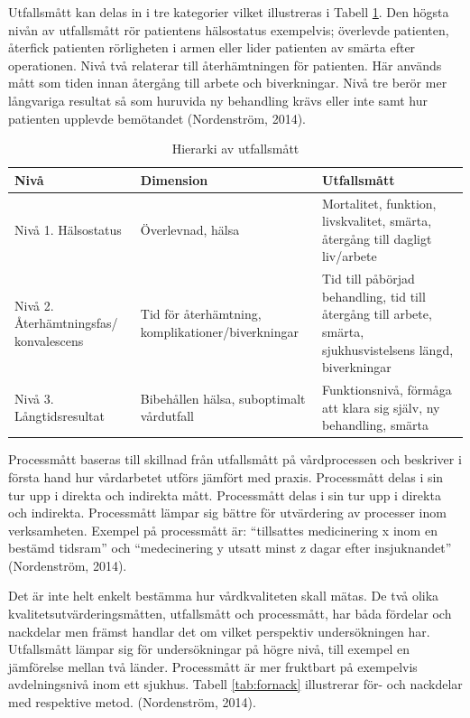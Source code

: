 Utfallsmått kan delas in i tre kategorier vilket illustreras i Tabell \ref{utfallsh}. Den högsta nivån av utfallsmått rör patientens hälsostatus exempelvis; överlevde patienten, återfick patienten rörligheten i armen eller lider patienten av smärta efter operationen. Nivå två relaterar till återhämtningen för patienten. Här används mått som tiden innan återgång till arbete och biverkningar. Nivå tre berör mer långvariga resultat så som huruvida ny behandling krävs eller inte samt hur patienten upplevde bemötandet  (Nordenström, 2014).

\begin{table}[h]
\centering
\caption{Hierarki av utfallsmått}
\label{utfallsh}
\begin{tabular}{|p{3cm}|p{5cm}|p{5cm}|}
\hline
Nivå & Dimension & Utfallsmått \\ \hline
Nivå 1. \newline Hälsostatus & Överlevnad, hälsa & Mortalitet, funktion, livskvalitet, smärta, återgång till dagligt liv/arbete \\ \hline
Nivå 2. \newline Återhämtningsfas/ konvalescens & Tid för återhämtning, komplikationer/biverkningar & Tid till påbörjad behandling, tid till återgång till arbete, smärta, sjukhusvistelsens längd, biverkningar \\ \hline
Nivå 3. \newline Långtidsresultat & Bibehållen hälsa, suboptimalt vårdutfall & Funktionsnivå, förmåga att klara sig själv, ny behandling, smärta \\ \hline
\end{tabular}
\end{table}

Processmått baseras till skillnad från utfallsmått på vårdprocessen och beskriver i första hand hur vårdarbetet utförs jämfört med praxis. Processmått delas i sin tur upp i direkta och indirekta mått.  Processmått delas i sin tur upp i direkta och indirekta. Processmått lämpar sig bättre för utvärdering av processer inom verksamheten. Exempel på processmått är: “tillsattes medicinering x inom en bestämd tidsram” och “medecinering y utsatt minst z dagar efter insjuknandet” (Nordenström, 2014).
 
Det är inte helt enkelt bestämma hur vårdkvaliteten skall mätas. De två olika kvalitetsutvärderingsmåtten, utfallsmått och processmått, har båda fördelar och nackdelar men främst handlar det om vilket perspektiv undersökningen har. Utfallsmått lämpar sig för undersökningar på högre nivå, till exempel en jämförelse mellan två länder. Processmått är mer fruktbart på exempelvis avdelningsnivå inom ett sjukhus. Tabell \ref{tab:fornack} illustrerar för- och nackdelar med respektive metod. (Nordenström, 2014).

